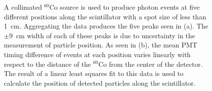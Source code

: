 \begin{figure}[]
    \centering
    

    \caption{
    A collimated $^{60}$Co source is used to produce photon events at five different positions along the scintillator with a spot size of less than 1~cm.
    Aggregating the data produces the five peaks seen in (a).
    The $\pm9$~cm width of each of these peaks is due to uncertainty in the measurement of particle position.
    As seen in (b), the mean PMT timing difference of events at each position varies linearly with respect to the distance of the $^{60}$Co from the center of the detector. 
    The result of a linear least squares fit to this data is used to calculate the position of detected particles along the scintillator.
    }
    \label{fig:PMTDifference}
\end{figure}

